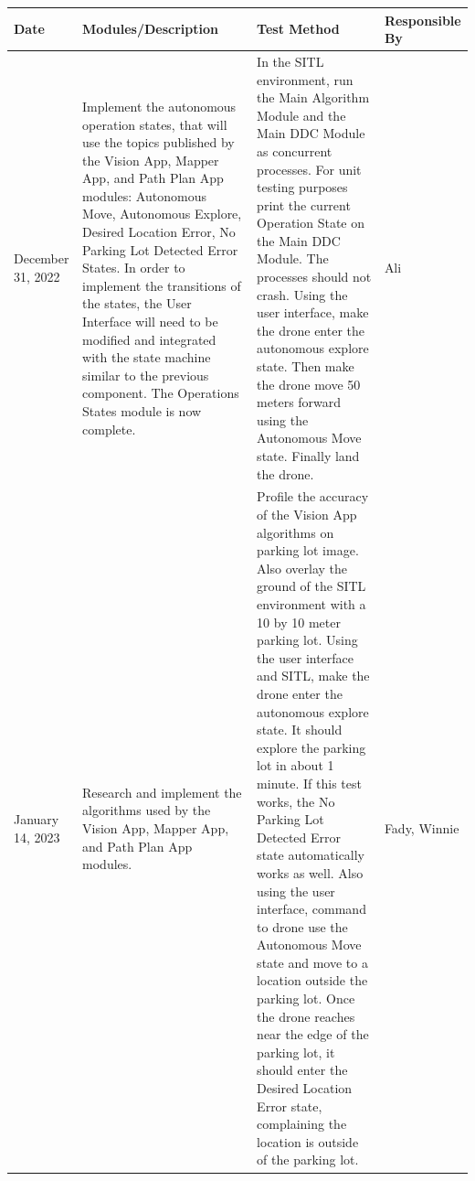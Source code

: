 \documentclass[12pt, titlepage]{article}
\begin{document}
\begin{table}[!h]
\begin{center}
\begin{tabular}{ | m{2.5cm} | m{5cm} | m{5.5cm} | m{2cm} | } 
\hline
Date & Modules/Description & Test Method & Responsible By \\
\hline
December 31, 2022 & Implement the autonomous operation states, that will use the topics published by the Vision App, Mapper App, and Path Plan App modules: Autonomous Move, Autonomous Explore, Desired Location Error, No Parking Lot Detected Error States. In order to implement the transitions of the states, the User Interface will need to be modified and integrated with the state machine similar to the previous component. The Operations States module is now complete. & 
    In the SITL environment, run the Main Algorithm Module and the Main DDC Module as concurrent processes. For unit testing purposes print the current Operation State on the Main DDC Module. The processes should not crash. Using the user interface, make the drone enter the autonomous explore state. Then make the drone move 50 meters forward using the Autonomous Move state. Finally land the drone.  & Ali \\
\hline
January 14, 2023 & Research and implement the algorithms used by the Vision App, Mapper App, and Path Plan App modules. & 
    Profile the accuracy of the Vision App algorithms on parking lot image. Also overlay the ground of the SITL environment with a 10 by 10 meter parking lot. Using the user interface and SITL, make the drone enter the autonomous explore state. It should explore the parking lot in about 1 minute. If this test works, the No Parking Lot Detected Error state automatically works as well. Also using the user interface, command to drone use the Autonomous Move state and move to a location outside the parking lot. Once the drone reaches near the edge of the parking lot, it should enter the Desired Location Error state, complaining the location is outside of the parking lot.  & Fady, Winnie \\
\hline
\end{tabular}
\end{center}
\end{table}
\end{document}
